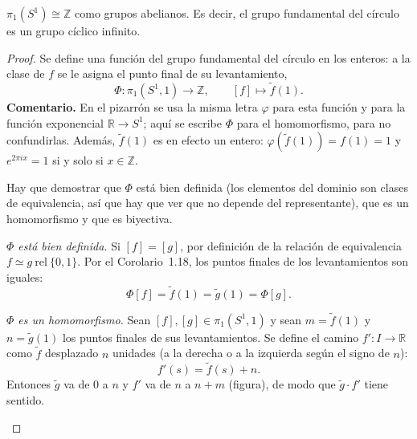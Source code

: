 \documentclass[11pt]{article}
\begin{document}
\begin{teo}
$\pi_1(S^1)\cong\mathbb{Z}$ como grupos abelianos. Es decir, el grupo fundamental del círculo es un grupo cíclico infinito.
\end{teo}

\begin{proof}
Se define una función del grupo fundamental del círculo en los enteros: a la clase de $f$ se le asigna el punto final de su levantamiento,
\[
  \Phi\colon\pi_1(S^1,1)\longrightarrow\mathbb{Z},
  \qquad
  [f]\longmapsto\tilde f(1).
\]
\textbf{Comentario.} En el pizarrón se usa la misma letra $\varphi$ para esta función y para la función exponencial $\mathbb{R}\to S^1$; aquí se escribe $\Phi$ para el homomorfismo, para no confundirlas. Además, $\tilde f(1)$ es en efecto un entero: $\varphi(\tilde f(1))=f(1)=1$ y $e^{2\pi i x}=1$ si y solo si $x\in\mathbb{Z}$.

Hay que demostrar que $\Phi$ está bien definida (los elementos del dominio son clases de equivalencia, así que hay que ver que no depende del representante), que es un homomorfismo y que es biyectiva.

\medskip\noindent\textit{$\Phi$ está bien definida.}
Si $[f]=[g]$, por definición de la relación de equivalencia $f\simeq g\ \mathrm{rel}\ \{0,1\}$. Por el Corolario~1.18, los puntos finales de los levantamientos son iguales:
\[
  \Phi[f]=\tilde f(1)=\tilde g(1)=\Phi[g].
\]

\medskip\noindent\textit{$\Phi$ es un homomorfismo.}
Sean $[f],[g]\in\pi_1(S^1,1)$ y sean $m=\tilde f(1)$ y $n=\tilde g(1)$ los puntos finales de sus levantamientos. Se define el camino $f'\colon I\to\mathbb{R}$ como $\tilde f$ desplazado $n$ unidades (a la derecha o a la izquierda según el signo de $n$):
\[
  f'(s)=\tilde f(s)+n.
\]
Entonces $\tilde g$ va de $0$ a $n$ y $f'$ va de $n$ a $n+m$ (figura), de modo que $\tilde g\cdot f'$ tiene sentido.

\begin{center}
\end{center}


\end{proof}
\end{document}
